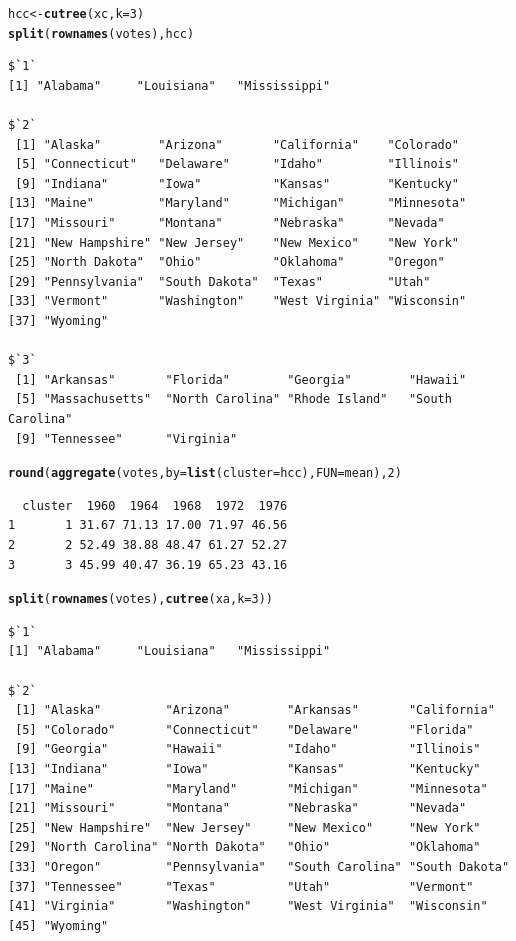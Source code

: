 \documentclass[11pt]{article}\usepackage[]{graphicx}\usepackage[]{xcolor}
\makeatletter
\newcommand{\hlnum}[1]{\textcolor[rgb]{0.686,0.059,0.569}{#1}}%
\newcommand{\hldef}[1]{\textcolor[rgb]{0.345,0.345,0.345}{#1}}%
\newcommand{\hlkwb}[1]{\textcolor[rgb]{0.69,0.353,0.396}{#1}}%
\newcommand{\hlkwc}[1]{\textcolor[rgb]{0.333,0.667,0.333}{#1}}%
\newcommand{\hlkwd}[1]{\textcolor[rgb]{0.737,0.353,0.396}{\textbf{#1}}}%
\newenvironment{kframe}{%
 \def\at@end@of@kframe{}%
 \ifinner\ifhmode%
  \def\at@end@of@kframe{\end{minipage}}%
  \begin{minipage}{\columnwidth}%
 \fi\fi%
 \def\FrameCommand##1{\hskip\@totalleftmargin \hskip-\fboxsep
 \colorbox{shadecolor}{##1}\hskip-\fboxsep
     \hskip-\linewidth \hskip-\@totalleftmargin \hskip\columnwidth}%
 \MakeFramed {\advance\hsize-\width
   \@totalleftmargin\z@ \linewidth\hsize
   \@setminipage}}%
 {\par\unskip\endMakeFramed%
 \at@end@of@kframe}
\newenvironment{knitrout}{}{} %
\makeatother
\begin{document}
\begin{knitrout}\small
{}\color{fgcolor}\begin{kframe}
\begin{alltt}
\hldef{hcc} \hlkwb{<-} \hlkwd{cutree}\hldef{(xc,} \hlkwc{k} \hldef{=} \hlnum{3}\hldef{)}
\hlkwd{split}\hldef{(}\hlkwd{rownames}\hldef{(votes), hcc)}
\end{alltt}
\begin{verbatim}
$`1`
[1] "Alabama"     "Louisiana"   "Mississippi"

$`2`
 [1] "Alaska"        "Arizona"       "California"    "Colorado"     
 [5] "Connecticut"   "Delaware"      "Idaho"         "Illinois"     
 [9] "Indiana"       "Iowa"          "Kansas"        "Kentucky"     
[13] "Maine"         "Maryland"      "Michigan"      "Minnesota"    
[17] "Missouri"      "Montana"       "Nebraska"      "Nevada"       
[21] "New Hampshire" "New Jersey"    "New Mexico"    "New York"     
[25] "North Dakota"  "Ohio"          "Oklahoma"      "Oregon"       
[29] "Pennsylvania"  "South Dakota"  "Texas"         "Utah"         
[33] "Vermont"       "Washington"    "West Virginia" "Wisconsin"    
[37] "Wyoming"      

$`3`
 [1] "Arkansas"       "Florida"        "Georgia"        "Hawaii"        
 [5] "Massachusetts"  "North Carolina" "Rhode Island"   "South Carolina"
 [9] "Tennessee"      "Virginia"      
\end{verbatim}
\begin{alltt}
\hlkwd{round}\hldef{(}\hlkwd{aggregate}\hldef{(votes,} \hlkwc{by} \hldef{=} \hlkwd{list}\hldef{(}\hlkwc{cluster} \hldef{= hcc),} \hlkwc{FUN} \hldef{= mean),} \hlnum{2}\hldef{)}
\end{alltt}
\begin{verbatim}
  cluster  1960  1964  1968  1972  1976
1       1 31.67 71.13 17.00 71.97 46.56
2       2 52.49 38.88 48.47 61.27 52.27
3       3 45.99 40.47 36.19 65.23 43.16
\end{verbatim}
\begin{alltt}
\hlkwd{split}\hldef{(}\hlkwd{rownames}\hldef{(votes),} \hlkwd{cutree}\hldef{(xa,} \hlkwc{k} \hldef{=} \hlnum{3}\hldef{))}
\end{alltt}
\begin{verbatim}
$`1`
[1] "Alabama"     "Louisiana"   "Mississippi"

$`2`
 [1] "Alaska"         "Arizona"        "Arkansas"       "California"    
 [5] "Colorado"       "Connecticut"    "Delaware"       "Florida"       
 [9] "Georgia"        "Hawaii"         "Idaho"          "Illinois"      
[13] "Indiana"        "Iowa"           "Kansas"         "Kentucky"      
[17] "Maine"          "Maryland"       "Michigan"       "Minnesota"     
[21] "Missouri"       "Montana"        "Nebraska"       "Nevada"        
[25] "New Hampshire"  "New Jersey"     "New Mexico"     "New York"      
[29] "North Carolina" "North Dakota"   "Ohio"           "Oklahoma"      
[33] "Oregon"         "Pennsylvania"   "South Carolina" "South Dakota"  
[37] "Tennessee"      "Texas"          "Utah"           "Vermont"       
[41] "Virginia"       "Washington"     "West Virginia"  "Wisconsin"     
[45] "Wyoming"       


\end{verbatim}
\end{kframe}
\end{knitrout}
\end{document}
